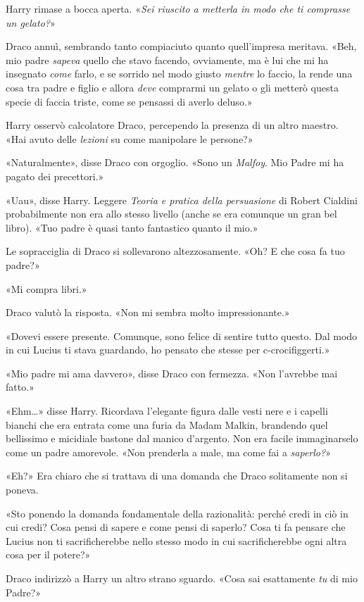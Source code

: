Harry rimase a bocca aperta. «\textit{Sei riuscito a metterla in modo che ti comprasse un gelato?}»

Draco annuì, sembrando tanto compiaciuto quanto quell’impresa meritava. «Beh, mio padre \textit{sapeva} quello che stavo facendo, ovviamente, ma è lui che mi ha insegnato \textit{come} farlo, e se sorrido nel modo giusto \textit{mentre} lo faccio, la rende una cosa tra padre e figlio e allora \textit{deve} comprarmi un gelato o gli metterò questa specie di faccia triste, come se pensassi di averlo deluso.»

Harry osservò calcolatore Draco, percependo la presenza di un altro maestro. «Hai avuto delle \textit{lezioni} su come manipolare le persone?»

«Naturalmente», disse Draco con orgoglio. «Sono un \textit{Malfoy}. Mio Padre mi ha pagato dei precettori.»

«Uau», disse Harry. Leggere \textit{Teoria e pratica della persuasione} di Robert Cialdini probabilmente non era allo stesso livello (anche se era comunque un gran bel libro). «Tuo padre è quasi tanto fantastico quanto il mio.»

Le sopracciglia di Draco si sollevarono altezzosamente. «Oh? E che cosa fa tuo padre?»

«Mi compra libri.»

Draco valutò la risposta. «Non mi sembra molto impressionante.»

«Dovevi essere presente. Comunque, sono felice di sentire tutto questo. Dal modo in cui Lucius ti stava guardando, ho pensato che stesse per c-crocifiggerti.»

«Mio padre mi ama davvero», disse Draco con fermezza. «Non l’avrebbe mai fatto.»

«Ehm…» disse Harry. Ricordava l’elegante figura dalle vesti nere e i capelli bianchi che era entrata come una furia da Madam Malkin, brandendo quel bellissimo e micidiale bastone dal manico d’argento. Non era facile immaginarselo come un padre amorevole. «Non prenderla a male, ma come fai a \textit{saperlo?}»

«Eh?» Era chiaro che si trattava di una domanda che Draco solitamente non si poneva.

«Sto ponendo la domanda fondamentale della razionalità: perché credi in ciò in cui credi? Cosa pensi di sapere e come pensi di saperlo? Cosa ti fa pensare che Lucius non ti sacrificherebbe nello stesso modo in cui sacrificherebbe ogni altra cosa per il potere?»

Draco indirizzò a Harry un altro strano sguardo. «Cosa sai esattamente \textit{tu} di mio Padre?»

